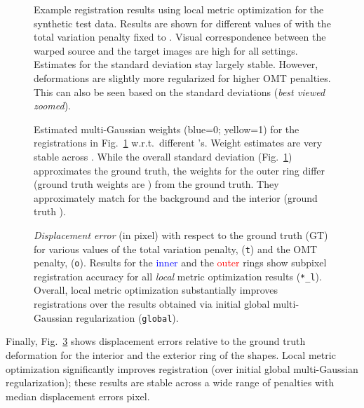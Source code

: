 \documentclass[10pt,twocolumn,letterpaper,table]{article}
\numberwithin{equation}{section}
\theoremstyle{plain}
\theoremstyle{definition}
\def\wrt{w.r.t.}
\begin{document}
\begin{figure}[t!]
  \caption{Example registration results using local metric optimization for the synthetic test data. Results are shown for different values of  with the total variation penalty fixed to . Visual correspondence between the warped source and the target images are high for all settings. Estimates for the standard deviation stay largely stable. However, deformations are slightly more regularized for higher OMT penalties. This can also be seen based on the standard deviations (\emph{best viewed zoomed}).}
  \label{fig:synth_example_results_images}
\end{figure}

\begin{figure}
\caption{Estimated multi-Gaussian weights (blue=0; yellow=1) for the registrations in Fig.~\ref{fig:synth_example_results_images} \wrt~different 's.
Weight estimates are very stable across . While the overall standard deviation (Fig.~\ref{fig:synth_example_results_images}) approximates the ground truth, the weights for the outer ring differ (ground truth weights are ) from the ground truth. They approximately match for the background and the interior (ground truth ).}
  \label{fig:synth_example_results_weights}
\end{figure}

\begin{figure}
  \caption{\emph{Displacement error} (in pixel) with respect to the ground truth (GT) for various values of the total variation penalty,  (\texttt{t}) and the OMT penalty,  (\texttt{o}). Results for the \textcolor{blue}{inner} and the \textcolor{red}{outer} rings show subpixel registration accuracy for all \emph{local} metric optimization results (\texttt{*\_l}). Overall, local metric optimization substantially improves registrations over the results obtained via initial global multi-Gaussian regularization (\texttt{global}).
    \label{fig:displacement_errors_within_shape}}
\end{figure}

Finally, Fig.~\ref{fig:displacement_errors_within_shape} shows displacement errors relative to the ground truth deformation for the interior and the exterior ring of the shapes. Local metric optimization significantly improves registration (over initial global multi-Gaussian regularization); these results are stable across a wide range of penalties with median displacement errors  pixel.
\end{document}
